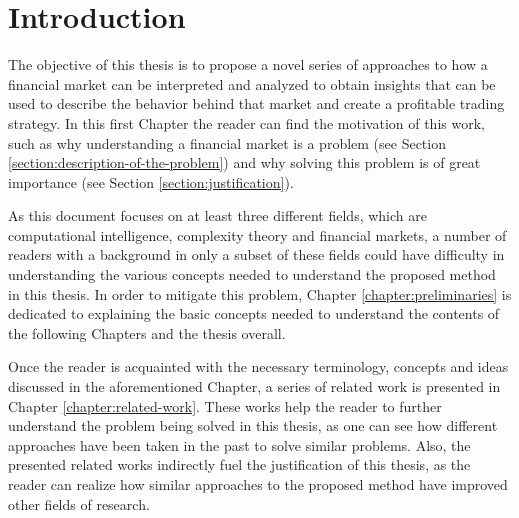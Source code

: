 \chapter{Introduction}
\label{chapter:introduction}




The objective of this thesis is to propose a novel series of approaches to how a financial market can be interpreted and analyzed to obtain insights that can be used to describe the behavior behind that market and create a profitable trading strategy. In this first Chapter the reader can find the motivation of this work, such as why understanding a financial market is a problem (see Section \ref{section:description-of-the-problem}) and why solving this problem is of great importance (see Section \ref{section:justification}).




As this document focuses on at least three different fields, which are computational intelligence, complexity theory and financial markets, a number of readers with a background in only a subset of these fields could have difficulty in understanding the various concepts needed to understand the proposed method in this thesis. In order to mitigate this problem, Chapter \ref{chapter:preliminaries} is dedicated to explaining the basic concepts needed to understand the contents of the following Chapters and the thesis overall.



Once the reader is acquainted with the necessary terminology, concepts and ideas discussed in the aforementioned Chapter, a series of related work is presented in Chapter \ref{chapter:related-work}. These works help the reader to further understand the problem being solved in this thesis, as one can see how different approaches have been taken in the past to solve similar problems. Also, the presented related works indirectly fuel the justification of this thesis, as the reader can realize how similar approaches to the proposed method have improved other fields of research.

